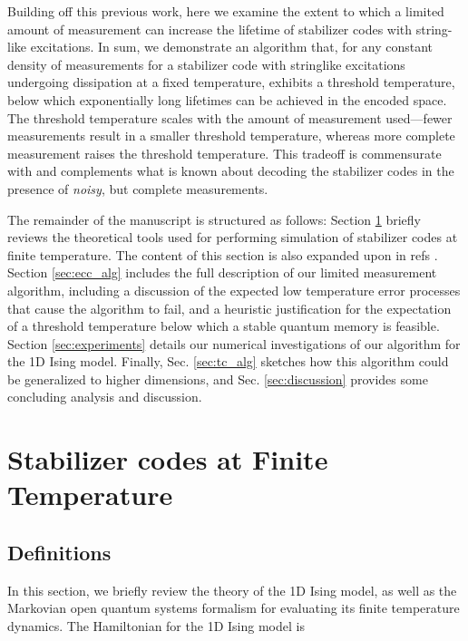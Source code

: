 \documentclass[twocolumn,superscriptaddress,aps,prb,floatfix]{revtex4-1}
\renewcommand*{\emph}[1]{{\it {#1}}}
\begin{document}
 Building off this previous work, here we examine the extent to which a limited amount of measurement can increase the lifetime of stabilizer codes with string-like excitations.  In sum, we demonstrate an algorithm that, for any constant density of measurements for a stabilizer code with stringlike excitations undergoing dissipation at a fixed temperature, exhibits a threshold temperature, below which exponentially long lifetimes can be achieved in the encoded space.  The threshold temperature scales with the amount of measurement used---fewer measurements result in a smaller threshold temperature, whereas more complete measurement raises the threshold temperature.  This tradeoff is commensurate with and complements what is known about decoding the stabilizer codes in the presence of \emph{noisy}, but complete measurements\cite{Nickerson2016}.
 
 The remainder of the manuscript is structured as follows:  Section \ref{sec:stabfintemp} briefly reviews the theoretical tools used for performing simulation of stabilizer codes at finite temperature.  The content of this section is also expanded upon in refs \cite{Freeman2014,Freeman2017}.  Section \ref{sec:ecc_alg} includes the full description of our limited measurement algorithm, including a discussion of the expected low temperature error processes that cause the algorithm to fail, and a heuristic justification for the expectation of a threshold temperature below which a stable quantum memory is feasible.  Section \ref{sec:experiments} details our numerical investigations of our algorithm for the 1D Ising model.  Finally, Sec. \ref{sec:tc_alg} sketches how this algorithm could be generalized to higher dimensions, and Sec. \ref{sec:discussion} provides some concluding analysis and discussion.

\section{Stabilizer codes at Finite Temperature}
\label{sec:stabfintemp}

\subsection{Definitions}
\label{sec:Defs}
In this section, we briefly review the theory of the 1D Ising model, as well as the Markovian open quantum systems formalism for evaluating its finite temperature dynamics.  The Hamiltonian for the 1D Ising model is
\end{document}

